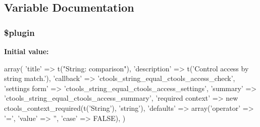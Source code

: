 \subsection{Variable Documentation}
\hypertarget{string__equal_8inc_ada8a7130088351710bb02ed622d6bf65}{
\subsubsection[{\$plugin}]{\setlength{\rightskip}{0pt plus 5cm}\$plugin}}
\label{string__equal_8inc_ada8a7130088351710bb02ed622d6bf65}
{\bfseries Initial value:}
\begin{DoxyCode}
 array(
  'title' => t("String: comparison"),
  'description' => t('Control access by string match.'),
  'callback' => 'ctools_string_equal_ctools_access_check',
  'settings form' => 'ctools_string_equal_ctools_access_settings',
  'summary' => 'ctools_string_equal_ctools_access_summary',
  'required context' => new ctools_context_required(t('String'), 'string'),
  'defaults' => array('operator' => '=', 'value' => '', 'case' => FALSE),
)
\end{DoxyCode}
